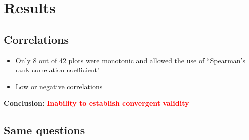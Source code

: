 \section{Results}

\subsection*{Correlations}

\begin{itemize}
	\item Only 8 out of 42 plots were monotonic and allowed the use of  ``Spearman's rank correlation coefficient"
	\item Low or negative correlations
\end{itemize}

\textbf{Conclusion:} \textcolor{red}{\textbf{Inability to establish convergent validity}}

\clearpage

\subsection*{Same questions} 


